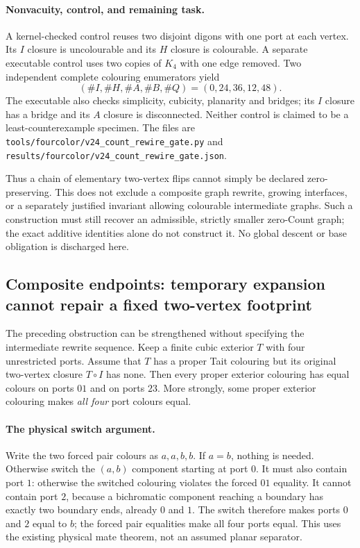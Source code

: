 \paragraph{Nonvacuity, control, and remaining task.}
A kernel-checked control reuses two disjoint digons with one port at each
vertex. Its $I$ closure is uncolourable and its $H$ closure is colourable.
A separate executable control uses two copies of $K_4$ with one edge
removed. Two independent complete colouring enumerators yield
\[
 (\#I,\#H,\#A,\#B,\#Q)=(0,24,36,12,48).
\]
The executable also checks simplicity, cubicity, planarity and bridges;
its $I$ closure has a bridge and its $A$ closure is disconnected. Neither
control is claimed to be a least-counterexample specimen. The files are
\texttt{tools/fourcolor/v24\_count\_rewire\_gate.py} and
\texttt{results/fourcolor/v24\_count\_rewire\_gate.json}.

Thus a chain of elementary two-vertex flips cannot simply be declared
zero-preserving. This does not exclude a composite graph rewrite,
growing interfaces, or a separately justified invariant allowing
colourable intermediate graphs. Such a construction must still recover
an admissible, strictly smaller zero-Count graph; the exact additive
identities alone do not construct it. No global descent or base
obligation is discharged here.

\subsection{Composite endpoints: temporary expansion cannot repair a fixed two-vertex footprint}
\label{sec:four-port-composite-endpoint}

The preceding obstruction can be strengthened without specifying the
intermediate rewrite sequence. Keep a finite cubic exterior $T$ with four
unrestricted ports. Assume that $T$ has a proper Tait colouring but its
original two-vertex closure $T\circ I$ has none. Then every proper exterior
colouring has equal colours on ports $01$ and on ports $23$.
More strongly, some proper exterior colouring makes \emph{all four} port
colours equal.

\paragraph{The physical switch argument.}
Write the two forced pair colours as $a,a,b,b$. If $a=b$, nothing is
needed. Otherwise switch the $(a,b)$ component starting at port $0$.
It must also contain port $1$: otherwise the switched colouring violates
the forced $01$ equality. It cannot contain port $2$, because a
bichromatic component reaching a boundary has exactly two boundary ends,
already $0$ and $1$. The switch therefore makes ports $0$ and $2$ equal
to $b$; the forced pair equalities make all four ports equal. This uses
the existing physical mate theorem, not an assumed planar separator.


